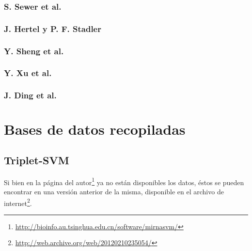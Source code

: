 \documentclass[12pt,bibliography=oldstyle,DIV=12,parskip=half-]{scrartcl}
\begin{document}
\subsubsection*{S. Sewer et al. \cite{sewer}}
%
\subsubsection*{J. Hertel y P. F. Stadler \cite{hertel}}
%
\subsubsection*{Y. Sheng et al. \cite{sheng}}
%
\subsubsection*{Y. Xu et al. \cite{xu}}
%
\subsubsection*{J. Ding et al. \cite{ding}}
%
%
%
%
\section{Bases de datos recopiladas}
%
\subsection{Triplet-SVM \cite{xue}}
%
Si bien en la página del
autor\footnote{\url{http://bioinfo.au.tsinghua.edu.cn/software/mirnasvm/}}
ya no están disponibles los datos, éstos se pueden encontrar en una
versión anterior de la misma, disponible en el archivo de
internet\footnote{\url{http://web.archive.org/web/20120210235054/}}.
\end{document}
